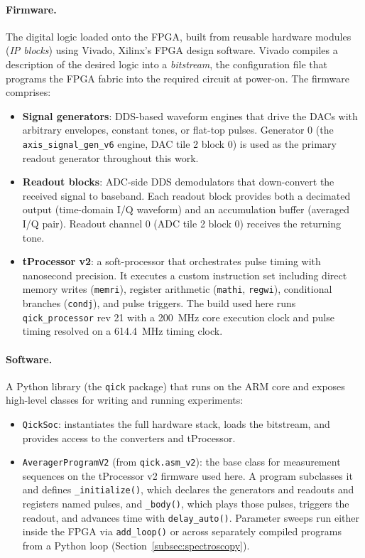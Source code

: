 \paragraph{Firmware.}
The digital logic loaded onto the FPGA, built from reusable hardware modules
(\emph{IP blocks}) using Vivado, Xilinx's FPGA design software.  Vivado
compiles a description of the desired logic into a \emph{bitstream}, the
configuration file that programs the FPGA fabric into the required circuit at
power-on.  The \QICK{} firmware comprises:
\begin{itemize}
      \item \textbf{Signal generators}: DDS-based waveform engines that drive the
            DACs with arbitrary envelopes, constant tones, or flat-top pulses.
            Generator 0 (the \texttt{axis\_signal\_gen\_v6} engine, DAC tile 2 block 0)
            is used as the primary readout generator throughout this work.
      \item \textbf{Readout blocks}: ADC-side DDS demodulators that down-convert the
            received signal to baseband.  Each readout block provides both a decimated
            output (time-domain I/Q waveform) and an accumulation buffer (averaged I/Q
            pair).  Readout channel 0 (ADC tile 2 block 0) receives the returning tone.
      \item \textbf{tProcessor v2}: a soft-processor that orchestrates pulse timing
            with nanosecond precision.  It executes a custom instruction set including
            direct memory writes (\texttt{memri}), register arithmetic (\texttt{mathi},
            \texttt{regwi}), conditional branches (\texttt{condj}), and pulse triggers.
            The build used here runs \texttt{qick\_processor} rev 21 with a
            \SI{200}{\mega\hertz} core execution clock and pulse timing resolved on
            a \SI{614.4}{\mega\hertz} timing clock.
\end{itemize}

\paragraph{Software.}
A Python library (the \texttt{qick} package) that runs on the ARM core and
exposes high-level classes for writing and running experiments:
\begin{itemize}
      \item \texttt{QickSoc}: instantiates the full hardware stack, loads the
            bitstream, and provides access to the converters and tProcessor.
      \item \texttt{AveragerProgramV2} (from \texttt{qick.asm\_v2}): the base class
            for measurement sequences on the tProcessor v2 firmware used here.  A
            program subclasses it and defines \texttt{\_initialize()}, which declares
            the generators and readouts and registers named pulses, and
            \texttt{\_body()}, which plays those pulses, triggers the readout, and
            advances time with \texttt{delay\_auto()}.  Parameter sweeps run either
            inside the FPGA via \texttt{add\_loop()} or across separately compiled
            programs from a Python loop (Section~\ref{subsec:spectroscopy}).
\end{itemize}


